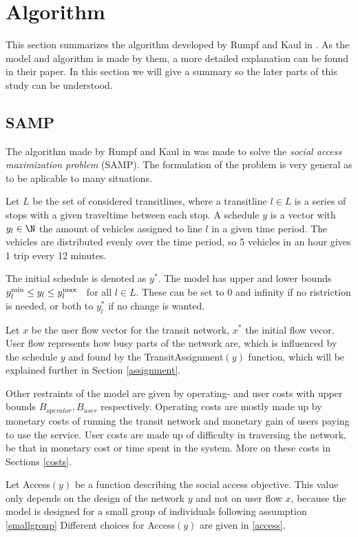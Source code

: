 \section{Algorithm}
This section summarizes the algorithm developed by Rumpf and Kaul in \cite{rumpf}. As the model and algorithm is made by them, a more detailed explanation can be found in their paper. In this section we will give a summary so the later parts of this study can be understood.
\subsection{SAMP}
The algorithm made by Rumpf and Kaul in \cite{rumpf} was made to solve the \emph{social access maximization problem} (SAMP). The formulation of the problem is very general as to be aplicable to many situations.

Let $L$ be the set of considered transitlines, where a transitline $l\in L$ is a series of stops with a given traveltime between each stop. A schedule $y$ is a vector with $y_l \in \N$ the amount of vehicles assigned to line $l$ in a given time period. The vehicles are distributed evenly over the time period, so 5 vehicles in an hour gives 1 trip every 12 minutes.

The initial schedule is denoted as $y^*$. The model has upper and lower bounds $y_l^{\text{min}} \leq y_l \leq y_l^{\text{max}} \hspace{2mm}$ for all $l\in L$. These can be set to 0 and infinity if no ristriction is needed, or both to $y^*_l$ if no change is wanted.

Let $x$ be the user flow vector for the transit network, $x^*$ the initial flow vecor. User flow represents how busy parts of the network are, which is influenced by the schedule $y$ and found by the TransitAssignment$(y)$ function, which will be explained further in Section \ref{assignment}.

Other restraints of the model are given by operating- and user costs with upper bounds $B_{operator},B_{user}$ respectively. Operating costs are mostly made up by monetary costs of running the transit network and monetary gain of users paying to use the service. User costs are made up of difficulty in traversing the network, be that in monetary cost or time spent in the system. More on these costs in Sections \ref{costs}.

Let Access$(y)$ be a function describing the social access objective. This value only depends on the design of the network $y$ and not on user flow $x$, because the model is designed for a small group of individuals following assumption \ref{smallgroup} Different choices for Access$(y)$ are given in \ref{access}.

